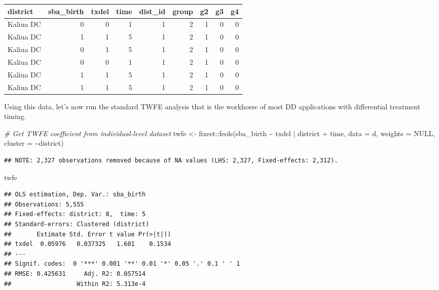 \documentclass[
]{article}
\newenvironment{Shaded}{\begin{snugshade}}{\end{snugshade}}
\newcommand{\AttributeTok}[1]{\textcolor[rgb]{0.77,0.63,0.00}{#1}}
\newcommand{\CommentTok}[1]{\textcolor[rgb]{0.56,0.35,0.01}{\textit{#1}}}
\newcommand{\ConstantTok}[1]{\textcolor[rgb]{0.00,0.00,0.00}{#1}}
\newcommand{\FunctionTok}[1]{\textcolor[rgb]{0.00,0.00,0.00}{#1}}
\newcommand{\NormalTok}[1]{#1}
\newcommand{\OtherTok}[1]{\textcolor[rgb]{0.56,0.35,0.01}{#1}}
\newcommand{\SpecialCharTok}[1]{\textcolor[rgb]{0.00,0.00,0.00}{#1}}
\begin{document}
\begin{table}
\centering
\begin{tabular}{l|r|r|r|r|r|r|r|r}
\hline
district & sba\_birth & txdel & time & dist\_id & group & g2 & g3 & g4\\
\hline
Kaliua DC & 0 & 0 & 1 & 1 & 2 & 1 & 0 & 0\\
\hline
Kaliua DC & 1 & 1 & 5 & 1 & 2 & 1 & 0 & 0\\
\hline
Kaliua DC & 0 & 1 & 5 & 1 & 2 & 1 & 0 & 0\\
\hline
Kaliua DC & 0 & 0 & 1 & 1 & 2 & 1 & 0 & 0\\
\hline
Kaliua DC & 1 & 1 & 5 & 1 & 2 & 1 & 0 & 0\\
\hline
Kaliua DC & 1 & 1 & 5 & 1 & 2 & 1 & 0 & 0\\
\hline
\end{tabular}
\end{table}

Using this data, let's now run the standard TWFE analysis that is the
workhorse of most DD applications with differential treatment timing.

\begin{Shaded}
\begin{Highlighting}[]
\CommentTok{\# Get TWFE coefficient from individual{-}level dataset}
\NormalTok{twfe }\OtherTok{\textless{}{-}}\NormalTok{ fixest}\SpecialCharTok{::}\FunctionTok{feols}\NormalTok{(sba\_birth }\SpecialCharTok{\textasciitilde{}}\NormalTok{ txdel }\SpecialCharTok{|}\NormalTok{ district }\SpecialCharTok{+}\NormalTok{ time, }
                      \AttributeTok{data =}\NormalTok{ d,}
                      \AttributeTok{weights =} \ConstantTok{NULL}\NormalTok{, }
                      \AttributeTok{cluster =} \SpecialCharTok{\textasciitilde{}}\NormalTok{district)}
\end{Highlighting}
\end{Shaded}

\begin{verbatim}
## NOTE: 2,327 observations removed because of NA values (LHS: 2,327, Fixed-effects: 2,312).
\end{verbatim}

\begin{Shaded}
\begin{Highlighting}[]
\NormalTok{twfe}
\end{Highlighting}
\end{Shaded}

\begin{verbatim}
## OLS estimation, Dep. Var.: sba_birth
## Observations: 5,555 
## Fixed-effects: district: 8,  time: 5
## Standard-errors: Clustered (district) 
##       Estimate Std. Error t value Pr(>|t|)) 
## txdel  0.05976   0.037325   1.601    0.1534 
## ---
## Signif. codes:  0 '***' 0.001 '**' 0.01 '*' 0.05 '.' 0.1 ' ' 1
## RMSE: 0.425631     Adj. R2: 0.057514
##                  Within R2: 5.313e-4
\end{verbatim}
\end{document}
